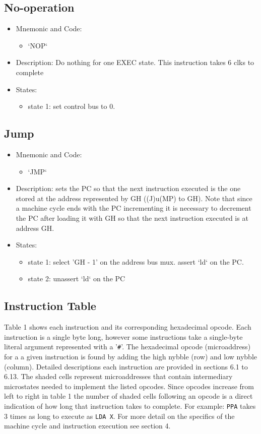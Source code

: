 \documentclass[a4paper,12pt]{article}
\begin{document}
\subsection{No-operation}
\begin{itemize}
\item Mnemonic and Code:
\begin{itemize}
	\item `NOP`
\end{itemize}
\item Description: Do nothing for one EXEC state. This instruction takes 6 clks to complete
\item States:
\begin{itemize}
	\item state 1: set control bus to 0.
\end{itemize}
\end{itemize}

\subsection{Jump}
\begin{itemize}
\item Mnemonic and Code:
\begin{itemize}
	\item `JMP`
\end{itemize}
\item Description: sets the PC so that the next instruction executed is the one stored at the address represented by GH ((J)u(MP) to GH). Note that since a machine cycle ends with the PC incrementing it is necessary to decrement the PC after loading it with GH so that the next instruction executed is at address GH.
\item States:
\begin{itemize}
	\item state 1: select 'GH - 1' on the address bus mux. assert `ld` on the PC.
	\item state 2: unassert `ld` on the PC
\end{itemize}
\end{itemize}

\subsection{Instruction Table}
Table 1 shows each instruction and its corresponding hexadecimal opcode. Each
instruction is a single byte long, however some instructions take a single-byte
literal argument represented with a '\texttt{\#}'. The hexadecimal opcode
(microaddress) for a a given instruction is found by adding the high nybble
(row) and low nybble (column). Detailed descriptions each instruction are
provided in sections 6.1 to 6.13. The shaded cells represent microaddresses
that contain intermediary microstates needed to implement the listed opcodes.
Since opcodes increase from left to right in table 1 the number of shaded cells
following an opcode is a direct indication of how long that instruction takes
to complete. For example: \texttt{PPA} takes 3 times as long to execute as
\texttt{LDA X}. For more detail on the specifics of the machine cycle and
instruction execution see section 4.
\par
\end{document}
